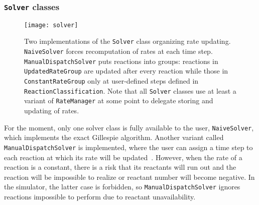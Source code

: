 \subsubsection{\texttt{Solver} classes}

\begin{figure}[!h]
  \centering
  \texttt{[image: solver]}
  \caption{Two implementations of the \texttt{Solver} class organizing rate updating.
  \texttt{NaiveSolver} forces recomputation of rates at each time step.
  \texttt{ManualDispatchSolver} puts reactions into groups:
  reactions in \texttt{UpdatedRateGroup} are updated after every reaction
  while those in \texttt{ConstantRateGroup} only at user-defined steps defined in \texttt{ReactionClassification}.
  Note that all \texttt{Solver} classes use at least a variant of \texttt{RateManager}
  at some point to delegate storing and updating of rates.}
\label{fig:solver_details}
\end{figure}

For the moment, only one solver class is fully available to the user, \texttt{NaiveSolver},
which implements the exact Gillespie algorithm.
Another variant called \texttt{ManualDispatchSolver} is implemented,
where the user can assign a time step to each reaction at which its rate will be updated~.
However, when the rate of a reaction is a constant,
there is a risk that its reactants will run out
and the reaction will be impossible to realize or reactant number will become negative.
In the simulator, the latter case is forbidden, so \texttt{ManualDispatchSolver}
ignores reactions impossible to perform due to reactant unavailability.
